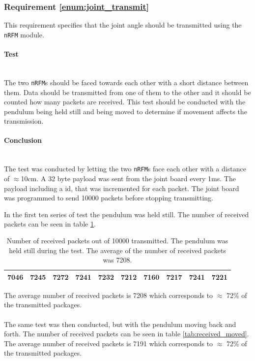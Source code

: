 {\subsubsection{Requirement \ref{enum:joint_transmit}} %
\label{ssub:requirement_enum:joint_transmit}
This requirement specifies that the joint angle should be transmitted using the \texttt{nRFM} module.

\paragraph{Test}~\\
The two \texttt{nRFM}s should be faced towards each other with a short distance between them.
Data should be transmitted from one of them to the other and it should be counted how many packets are received.
This test should be conducted with the pendulum being held still and being moved to determine if movement affects the transmission.

\paragraph{Conclusion}~\\
The test was conducted by letting the two \texttt{nRFM}s face each other with a distance of $\approx$10cm.
A 32 byte payload was sent from the joint board every 1ms. 
The payload including a id, that was incremented for each packet.
The joint board was programmed to send 10000 packets before stopping transmitting. 

In the first ten series of test the pendulum was held still.
The number of received packets can be seen in table \ref{tab:received_still}.
\begin{table}[h]
\centering
\begin{tabular}{|l|l|l|l|l|l|l|l|l|l|}
\hline
7046 & 7245 & 7272 & 7241 & 7232 & 7212 & 7160 & 7217 & 7241 & 7221 \\ \hline
\end{tabular}
\caption[Number of received packets without movement.]{Number of received packets out of 10000 transmitted. The pendulum was held still during the test. The average of the number of received packets was 7208.}
\label{tab:received_still}
\end{table}
The average number of received packets is 7208 which corresponds to $\approx$ 72\% of the transmitted packages.
\\~\\
The same test was then conducted, but with the pendulum moving back and forth.
The number of received packets can be seen in table \ref{tab:received_moved}.
The average number of received packets is 7191 which corresponds to $\approx$ 72\% of the transmitted packages.

}
